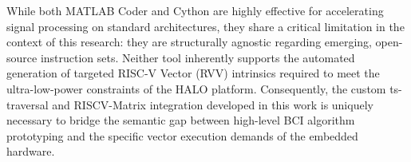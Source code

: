 While both MATLAB Coder and Cython are highly effective for accelerating signal processing on standard architectures, they share a critical limitation in the context of this research: they are structurally agnostic regarding emerging, open-source instruction sets. Neither tool inherently supports the automated generation of targeted RISC-V Vector (RVV) intrinsics required to meet the ultra-low-power constraints of the HALO platform. Consequently, the custom ts-traversal and RISCV-Matrix integration developed in this work is uniquely necessary to bridge the semantic gap between high-level BCI algorithm prototyping and the specific vector execution demands of the embedded hardware.
